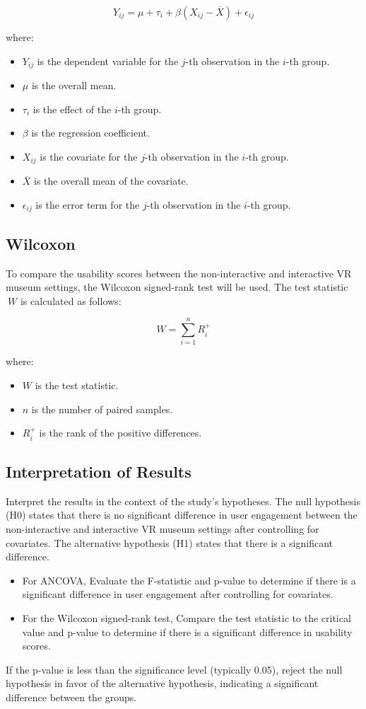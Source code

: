 \documentclass[conference]{IEEEtran}
\begin{document}
\[ Y_{ij} = \mu + \tau_i + \beta(X_{ij} - \overline{X}) + \epsilon_{ij} \]

where:
\begin{itemize}
    \item \( Y_{ij} \) is the dependent variable for the \( j \)-th observation in the \( i \)-th group.
    \item \( \mu \) is the overall mean.
    \item \( \tau_i \) is the effect of the \( i \)-th group.
    \item \( \beta \) is the regression coefficient.
    \item \( X_{ij} \) is the covariate for the \( j \)-th observation in the \( i \)-th group.
    \item \( \overline{X} \) is the overall mean of the covariate.
    \item \( \epsilon_{ij} \) is the error term for the \( j \)-th observation in the \( i \)-th group.
\end{itemize}

\subsection{Wilcoxon}
To compare the usability scores between the non-interactive and interactive VR museum settings, the Wilcoxon signed-rank test will be used. The test statistic \( \ W \) is calculated as follows:

\[
W = \sum_{i=1}^n R_i^+
\]

where:
\begin{itemize}
    \item \( W \) is the test statistic.
    \item \( n \) is the number of paired samples.
    \item \( R_i^+ \) is the rank of the positive differences.
\end{itemize}

\subsection{Interpretation of Results} 
Interpret the results in the context of the study's hypotheses. The null hypothesis (H0) states that there is no significant difference in user engagement between the non-interactive and interactive VR museum settings after controlling for covariates. The alternative hypothesis (H1) states that there is a significant difference.

\begin{itemize}
    \item For ANCOVA, Evaluate the F-statistic and p-value to determine if there is a significant difference in user engagement after controlling for covariates.
\item For the Wilcoxon signed-rank test, Compare the test statistic to the critical value and p-value to determine if there is a significant difference in usability scores.
\end{itemize}
If the p-value is less than the significance level (typically 0.05), reject the null hypothesis in favor of the alternative hypothesis, indicating a significant difference between the groups.
\end{document}

